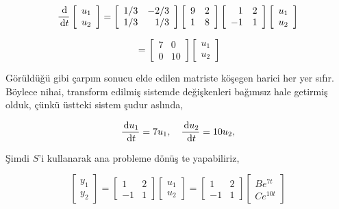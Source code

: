\documentclass[12pt,fleqn]{article}\usepackage{../../common}
\begin{document}
$$
\frac{\,\mathrm{d}}{\,\mathrm{d} t} \left[\begin{array}{c}
u_1 \\ u_2 
\end{array}\right] =
\left[\begin{array}{rr}
1/3 & -2/3 \\ 1/3 & 1/3
\end{array}\right]
\left[\begin{array}{cc}
9 & 2 \\ 1 & 8
\end{array}\right]
\left[\begin{array}{rr}
1 & 2 \\ -1 & 1
\end{array}\right]
\left[\begin{array}{c}
u_1 \\ u_2 
\end{array}\right]
$$

$$
= \left[\begin{array}{rr}
7 & 0 \\ 0 & 10
\end{array}\right]
\left[\begin{array}{c}
u_1 \\ u_2 
\end{array}\right]
$$

Görüldüğü gibi çarpım sonucu elde edilen matriste köşegen harici her yer
sıfır. Böylece nihai, transform edilmiş sistemde değişkenleri bağımsız
hale getirmiş olduk, çünkü üstteki sistem şudur aslında,

$$
\frac{\,\mathrm{d} u_1}{\,\mathrm{d} t} = 7 u_1, \quad
\frac{\,\mathrm{d} u_2}{\,\mathrm{d} t} = 10 u_2, 
$$

Şimdi $S$'i kullanarak ana probleme dönüş te yapabiliriz, 

$$
\left[\begin{array}{c} y_1 \\ y_2  \end{array}\right] =
\left[\begin{array}{rr}
1 & 2 \\ -1 & 1
\end{array}\right]
\left[\begin{array}{c} u_1 \\ u_2  \end{array}\right] =
\left[\begin{array}{rr}
1 & 2 \\ -1 & 1
\end{array}\right]
\left[\begin{array}{c} B e^{7t} \\ C e^{10t}  \end{array}\right] 
$$
\end{document}
